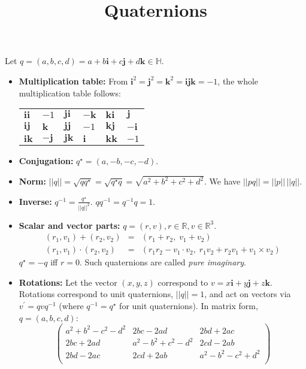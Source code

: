 \documentclass[a4paper]{article}
\title{Quaternions}
\author{}
\date{}
\begin{document}
\maketitle
Let $q = (a,b,c,d) = a + b\mathbf{i} + c\mathbf{j} + d\mathbf{k} \in \mathbb{H}$.
\begin{itemize}
\item\textbf{Multiplication table:} From $\mathbf{i}^2 = \mathbf{j}^2 = \mathbf{k}^2 = \mathbf{i}\mathbf{j}\mathbf{k} = -1$, the whole multiplication table follows:

\begin{tabular}{l@{$\;=\;$}ll@{$\;=\;$}ll@{$\;=\;$}l}
$\mathbf{i}\mathbf{i}$ & $-1$ &
$\mathbf{j}\mathbf{i}$ & $-\mathbf{k}$ &
$\mathbf{k}\mathbf{i}$ & $\mathbf{j}$\\
$\mathbf{i}\mathbf{j}$ & $\mathbf{k}$ &
$\mathbf{j}\mathbf{j}$ & $-1$ &
$\mathbf{k}\mathbf{j}$ & $-\mathbf{i}$\\
$\mathbf{i}\mathbf{k}$ & $-\mathbf{j}$ &
$\mathbf{j}\mathbf{k}$ & $\mathbf{i}$ &
$\mathbf{k}\mathbf{k}$ & $-1$\\
\end{tabular}

\item\textbf{Conjugation:} $q^\star = (a, -b, -c, -d)$.

\item\textbf{Norm:} $||q|| = \sqrt{q q^\star} = \sqrt{q^\star q} = \sqrt{a^2 + b^2 + c^2 + d^2}$. We have $||p q|| = ||p||\,||q||$.

\item\textbf{Inverse:} $q^{-1} = \frac{q^\star}{||q||^2}$. $q q^{-1} = q^{-1} q = 1$.

\item\textbf{Scalar and vector parts:} $q = (r, v), r \in \mathbb{R}, v \in \mathbb{R}^3$.
\begin{eqnarray*}
(r_1, v_1) + (r_2, v_2) &=& (r_1 + r_2,\; v_1 + v_2)\\
(r_1, v_1) \cdot (r_2, v_2) &=& (r_1 r_2 - v_1 \cdot v_2,\; r_1 v_2 + r_2 v_1 + v_1 \times v_2)
\end{eqnarray*}
$q^\star = -q$ iff $r = 0$. Such quaternions are called \textit{pure imaginary}.

\item\textbf{Rotations:} Let the vector $(x, y, z)$ correspond to $v = x\mathbf{i} + y\mathbf{j} + z\mathbf{k}$. Rotations correspond to unit quaternions, $||q|| = 1$, and act on vectors via $v^\prime = q v q^{-1}$ (where $q^{-1} = q^\star$ for unit quaternions). In matrix form, $q = (a,b,c,d)$:
\begin{displaymath}
\left(\begin{array}{ccc}
a^2+b^2-c^2-d^2 & 2bc-2ad         & 2bd+2ac        \\
2bc+2ad         & a^2-b^2+c^2-d^2 & 2cd-2ab        \\
2bd-2ac         & 2cd+2ab         & a^2-b^2-c^2+d^2\\
\end{array}\right)
\end{displaymath}


\end{itemize}
\end{document}
